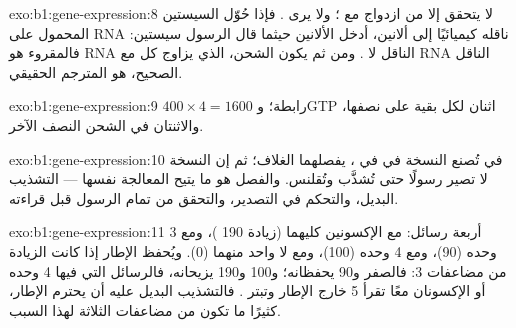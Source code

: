 \begin{solution}{exo:b1:gene-expression:8}
لا يتحقق  إلا من ازدواج  مع ؛ ولا
يرى . فإذا حُوّل السيستين المحمول على RNA ناقله
كيميائيًا إلى ألانين، أدخل  الألانين حيثما قال الرسول
سيستين: فالمقروء هو RNA الناقل لا . ومن ثم يكون 
الشحن، الذي يزاوج كل  مع RNA الناقل الصحيح، هو المترجم
الحقيقي.
\end{solution}

\begin{solution}{exo:b1:gene-expression:9}
$400\times 4 = 1600$ رابطة؛ وGTP اثنان لكل بقية على  نصفها،
والاثنتان في  الشحن النصف الآخر.
\end{solution}

\begin{solution}{exo:b1:gene-expression:10}
في  تُصنع النسخة في   في ،
يفصلهما الغلاف؛ ثم إن النسخة لا تصير رسولًا حتى تُشذَّب وتُقلنس.
والفصل هو ما يتيح المعالجة نفسها --- التشذيب البديل، والتحكم في
التصدير، والتحقق من تمام الرسول قبل قراءته.
\end{solution}

\begin{solution}{exo:b1:gene-expression:11}
أربعة رسائل: مع الإكسونين كليهما (زيادة 190 )، ومع 3 وحده
(90)، ومع 4 وحده (100)، ومع لا واحد منهما (0). ويُحفظ الإطار إذا
كانت الزيادة من مضاعفات 3: فالصفر و90 يحفظانه؛ و100 و190 يزيحانه،
فالرسائل التي فيها  4 وحده أو الإكسونان معًا تقرأ  5
خارج الإطار وتبتر . فالتشذيب البديل عليه أن يحترم الإطار،
 كثيرًا ما تكون من مضاعفات الثلاثة لهذا السبب.
\end{solution}


